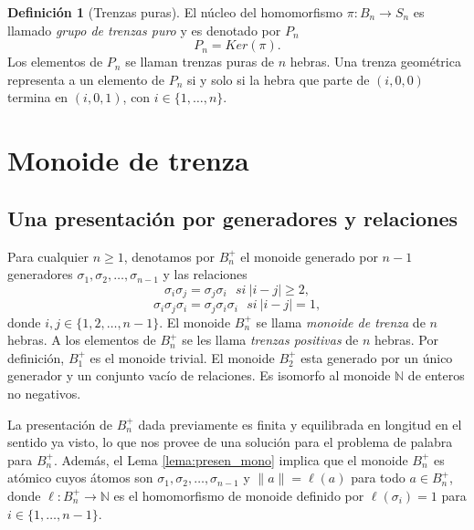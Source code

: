 \documentclass[12pt]{book}
\theoremstyle{definition}
\newtheorem{defi}{Definición}[section]
\providecommand{\norm}[1]{\lVert#1\rVert}
\begin{document}
\begin{defi}[Trenzas puras]
El núcleo del homomorfismo $\pi:B_n\rightarrow S_n$ es llamado \textit{grupo de trenzas puro} y es denotado por $P_n$
$$P_n = Ker(\pi).$$
Los elementos de $P_n$ se llaman trenzas puras de $n$ hebras. Una trenza geométrica representa a un elemento de $P_n$ si y solo si la hebra que parte de $(i,0,0)$ termina en $(i,0,1)$, con $i \in\{ 1,\ldots,n\}$.

\end{defi}



















\chapter{Monoide de trenza}

\section{Una presentación por generadores y relaciones}

Para cualquier $n\geq 1$, denotamos por $B_n^+$ el monoide generado por $n-1$ generadores $\sigma_1,\sigma_2,\ldots,\sigma_{n-1}$ y las relaciones
$$\sigma_i\sigma_j=\sigma_j\sigma_i\ \ \ si\ |i-j|\geq 2,$$
$$\sigma_i\sigma_j\sigma_i=\sigma_j\sigma_i\sigma_i\ \ \ si\ |i-j|= 1,$$
donde $i,j\in\{1,2,\ldots,n-1\}$. El monoide $B_n^+$ se llama \textit{monoide de trenza} de $n$ hebras. A los elementos de $B_n^+$ se les llama \textit{trenzas positivas} de $n$ hebras. Por definición, $B_1^+$ es el monoide trivial. El monoide $B_2^+$ esta generado por un único generador y un conjunto vacío de relaciones. Es isomorfo al monoide $\mathbb{N}$ de enteros no negativos.

La presentación de $B_n^+$ dada previamente es finita y equilibrada en longitud en el sentido ya visto, lo que nos provee de una solución para el problema de palabra para $B_n^+$. Además, el Lema \ref{lema:presen_mono} implica que el monoide $B_n^+$ es atómico cuyos átomos son $\sigma_1,\sigma_2,\ldots,\sigma_{n-1}$ y $\norm{a}=\ell(a)$ para todo $a\in B_n^+$, donde $\ell : B_n^+\rightarrow \mathbb{N}$ es el homomorfismo de monoide definido por $\ell(\sigma_i)=1$ para $i\in\{1,\ldots,n-1\}$.
\end{document}
